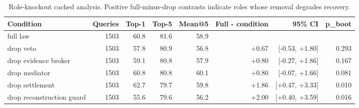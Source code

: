 \begin{table}[t]
\centering
\begin{tabular}{lrrrrrrr}
\toprule
Condition & Queries & Top-1 & Top-5 & Mean@5 & Full - condition & 95\% CI & p\_boot \\
\midrule
full law & 1503 & 60.8 & 81.6 & 58.9 &  &  &  \\
drop veto & 1503 & 57.8 & 80.9 & 56.8 & +0.67 & [-0.53, +1.80] & 0.293 \\
drop evidence broker & 1503 & 59.1 & 80.8 & 57.9 & +0.80 & [-0.27, +1.86] & 0.167 \\
drop mediator & 1503 & 60.8 & 80.8 & 60.1 & +0.80 & [-0.07, +1.66] & 0.081 \\
drop settlement & 1503 & 62.7 & 79.7 & 59.8 & +1.86 & [+0.47, +3.33] & 0.010 \\
drop reconstruction guard & 1503 & 55.6 & 79.6 & 56.2 & +2.00 & [+0.40, +3.59] & 0.016 \\
\bottomrule
\end{tabular}
\caption{Role-knockout cached analysis. Positive full-minus-drop contrasts indicate roles whose removal degrades recovery.}
\label{tab:ngc\_role\_knockout}
\end{table}

